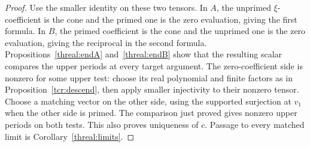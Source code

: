 \begin{proof}
Use the smaller identity on these two tensors. In \(A\), the
unprimed \(\xi\)-coefficient is the cone and the primed one is the
zero evaluation, giving the first formula. In \(B\), the primed
coefficient is the cone and the unprimed one is the zero evaluation,
giving the reciprocal in the second formula.
Propositions~\ref{threal:endA} and~\ref{threal:endB} show that
the resulting scalar compares the upper periods at every target
argument. The zero-coefficient side is nonzero for some upper
test: choose its real polynomial and finite factors as in
Proposition~\ref{tcr:descend}, then apply smaller injectivity to
their nonzero tensor. Choose a matching vector on the other side,
using the supported surjection at \(v_1\) when the other side is
primed. The comparison just proved gives nonzero upper periods
on both tests. This also proves uniqueness of \(c\). Passage to
every matched limit is Corollary~\ref{threal:limits}.


\end{proof}
